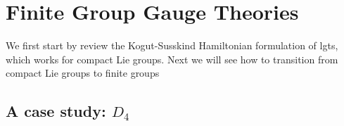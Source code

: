 \chapter{Finite Group Gauge Theories}
\label{chap:finite_group_gauge_theories}

We first start by review the Kogut-Susskind Hamiltonian formulation of \acp{lgt}, which works for compact Lie groups.
Next we will see how to transition from compact Lie groups to finite groups










\section{A case study: \texorpdfstring{$D_4$}{D4}}
\label{sec:a_case_study_d4}

